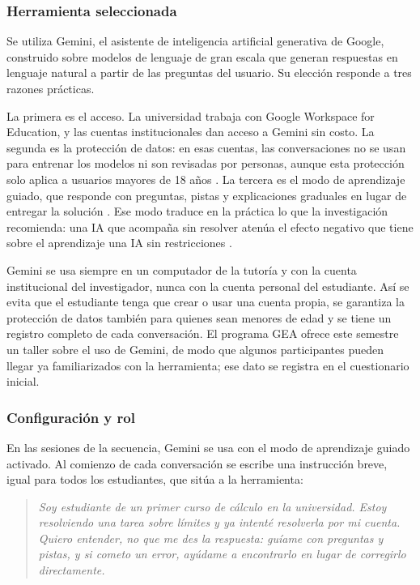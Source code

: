 \subsubsection{Herramienta seleccionada}

Se utiliza Gemini, el asistente de inteligencia artificial generativa de Google, construido sobre modelos de lenguaje de gran escala que generan respuestas en lenguaje natural a partir de las preguntas del usuario. Su elección responde a tres razones prácticas.

La primera es el acceso. La universidad trabaja con Google Workspace for Education, y las cuentas institucionales dan acceso a Gemini sin costo. La segunda es la protección de datos: en esas cuentas, las conversaciones no se usan para entrenar los modelos ni son revisadas por personas, aunque esta protección solo aplica a usuarios mayores de 18 años \parencite{google2025workspaceedu}. La tercera es el modo de aprendizaje guiado, que responde con preguntas, pistas y explicaciones graduales en lugar de entregar la solución \parencite{google2025guided}. Ese modo traduce en la práctica lo que la investigación recomienda: una IA que acompaña sin resolver atenúa el efecto negativo que tiene sobre el aprendizaje una IA sin restricciones \parencite{bastani2025guardrails}.

Gemini se usa siempre en un computador de la tutoría y con la cuenta institucional del investigador, nunca con la cuenta personal del estudiante. Así se evita que el estudiante tenga que crear o usar una cuenta propia, se garantiza la protección de datos también para quienes sean menores de edad y se tiene un registro completo de cada conversación. El programa GEA ofrece este semestre un taller sobre el uso de Gemini, de modo que algunos participantes pueden llegar ya familiarizados con la herramienta; ese dato se registra en el cuestionario inicial.

\subsubsection{Configuración y rol}

En las sesiones de la secuencia, Gemini se usa con el modo de aprendizaje guiado activado. Al comienzo de cada conversación se escribe una instrucción breve, igual para todos los estudiantes, que sitúa a la herramienta:

\bigskip
\begin{quote}
\itshape
Soy estudiante de un primer curso de cálculo en la universidad. Estoy resolviendo una tarea sobre límites y ya intenté resolverla por mi cuenta. Quiero entender, no que me des la respuesta: guíame con preguntas y pistas, y si cometo un error, ayúdame a encontrarlo en lugar de corregirlo directamente.
\end{quote}
\bigskip

